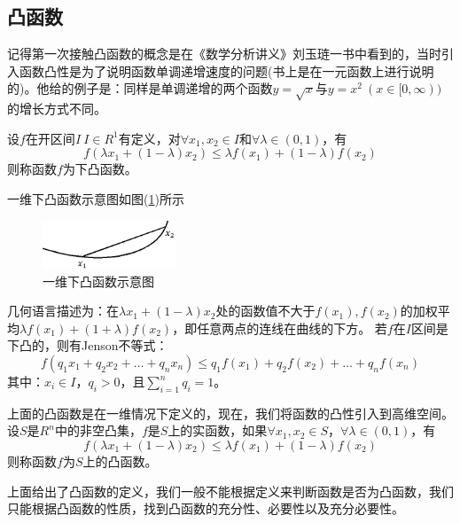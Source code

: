 	\subsection{凸函数}
		\par
		记得第一次接触凸函数的概念是在《数学分析讲义》刘玉琏一书中看到的，当时引入函数凸性是为了说明函数单调递增速度的问题(书上是在一元函数上进行说明的)。他给的例子是：同样是单调递增的两个函数$y=\sqrt{x}$与$y=x^2\ (x\in [0,\infty))$的增长方式不同。
		\begin{definition}[凸函数]
		设$f$在开区间$I\ I\in R^1$有定义，对$\forall x_1,x_2\in I$和$\forall \lambda\in (0,1)$，有
		\[
		f(\lambda x_1+(1-\lambda)x_2) \leqslant \lambda f(x_1)+(1-\lambda)f(x_2)
		\]
		则称函数$f$为下凸函数。
		\end{definition}
		一维下凸函数示意图如图(\ref{fig:一维下凸函数示意图})所示
		\begin{figure}[H]
		\centering
		\includegraphics[width=4cm]{images/One_dimensional_convex_function.jpg}
		\caption{一维下凸函数示意图}
		\label{fig:一维下凸函数示意图}
		\end{figure}
		几何语言描述为：在$\lambda x_1+(1-\lambda)x_2$处的函数值不大于$f(x_1),f(x_2)$的加权平均$\lambda f(x_1)+(1+\lambda) f(x_2)$，即任意两点的连线在曲线的下方。
		若$f$在$I$区间是下凸的，则有Jenson不等式：
		\[
		f(q_1x_1+q_2x_2+\dots +q_nx_n) \leqslant q_1f(x_1)+q_2f(x_2)+\dots +q_nf(x_n)
		\]
		其中：$x_i\in I$，$q_i>0$，且$\sum_{i=1}^{n}q_i=1$。
		\par
		上面的凸函数是在一维情况下定义的，现在，我们将函数的凸性引入到高维空间。设$S$是$R^n$中的非空凸集，$f$是$S$上的实函数，如果$\forall x_1,x_2\in S$，$\forall \lambda\in (0,1)$，有
		\[
		f(\lambda x_1+(1-\lambda)x_2) \leqslant \lambda f(x_1)+(1-\lambda)f(x_2)
		\]
		则称函数$f$为$S$上的凸函数。
		\par
		上面给出了凸函数的定义，我们一般不能根据定义来判断函数是否为凸函数，我们只能根据凸函数的性质，找到凸函数的充分性、必要性以及充分必要性。
